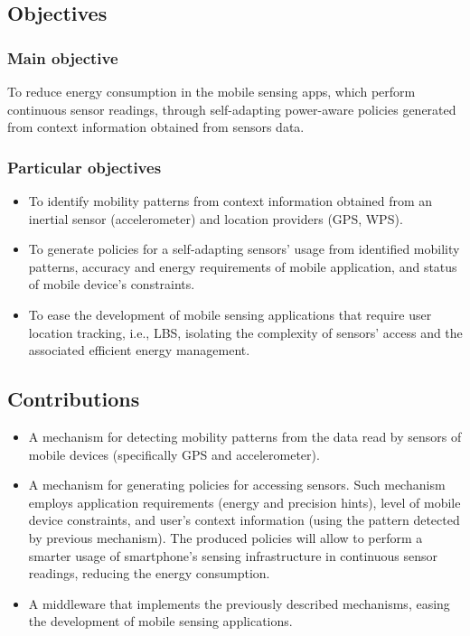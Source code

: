\documentclass[ENG,PhD]{cinvestav}
\begin{document}
\subsection{Objectives} 
\label{sub:objectives}

\subsubsection*{Main objective}
\label{ssub:main_objective}
To reduce energy consumption in the mobile sensing apps, which perform continuous sensor readings, through self-adapting power-aware policies generated from context information obtained from sensors data.

\subsubsection*{Particular objectives} 
\label{ssub:particular_objectives}
\begin{itemize}
  \item To identify mobility patterns from context information obtained from an inertial sensor (accelerometer) and location providers (GPS, WPS).
  \item To generate policies for a self-adapting sensors' usage from identified mobility patterns, accuracy and energy requirements of mobile application, and status of mobile device's constraints. 
  \item To ease the development of mobile sensing applications that require user location tracking, i.e., LBS, isolating the complexity of sensors' access and the associated efficient energy management.
\end{itemize}


\subsection{Contributions} 
\label{sub:contributions}

\begin{itemize}
  \item A mechanism for detecting mobility patterns from the data read by sensors of mobile devices (specifically GPS and accelerometer).
  \item A mechanism for generating policies for accessing sensors.
  Such mechanism employs application requirements (energy and precision hints), level of mobile device constraints, and user's context information (using the pattern detected by previous mechanism).
  The produced policies will allow to perform a smarter usage of smartphone's sensing infrastructure in continuous sensor readings, reducing the energy consumption.
  \item A middleware that implements the previously described mechanisms, easing the development of mobile sensing applications.
\end{itemize}
\end{document}
